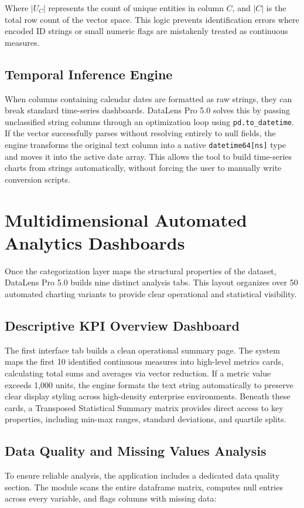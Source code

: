 \documentclass[11pt,a4paper,titlepage]{article}
\begin{document}
Where $|U_C|$ represents the count of unique entities in column $C$, and $|C|$ is the total row count of the vector space. This logic prevents identification errors where encoded ID strings or small numeric flags are mistakenly treated as continuous measures.

\subsection{Temporal Inference Engine}
When columns containing calendar dates are formatted as raw strings, they can break standard time-series dashboards. DataLens Pro 5.0 solves this by passing unclassified string columns through an optimization loop using \texttt{pd.to\_datetime}. If the vector successfully parses without resolving entirely to null fields, the engine transforms the original text column into a native \texttt{datetime64[ns]} type and moves it into the active date array. This allows the tool to build time-series charts from strings automatically, without forcing the user to manually write conversion scripts.


\section{Multidimensional Automated Analytics Dashboards}
Once the categorization layer maps the structural properties of the dataset, DataLens Pro 5.0 builds nine distinct analysis tabs. This layout organizes over 50 automated charting variants to provide clear operational and statistical visibility.

\subsection{Descriptive KPI Overview Dashboard}
The first interface tab builds a clean operational summary page. The system maps the first 10 identified continuous measures into high-level metrics cards, calculating total sums and averages via vector reduction. If a metric value exceeds 1,000 units, the engine formats the text string automatically to preserve clear display styling across high-density enterprise environments. Beneath these cards, a Transposed Statistical Summary matrix provides direct access to key properties, including min-max ranges, standard deviations, and quartile splits.

\subsection{Data Quality and Missing Values Analysis}
To ensure reliable analysis, the application includes a dedicated data quality section. The module scans the entire dataframe matrix, computes null entries across every variable, and flags columns with missing data:
\end{document}
